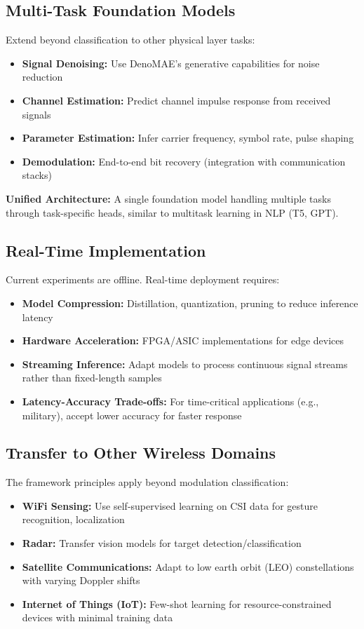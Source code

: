 \subsection{Multi-Task Foundation Models}

Extend beyond classification to other physical layer tasks:
\begin{itemize}
    \item \textbf{Signal Denoising:} Use DenoMAE's generative capabilities for noise reduction
    \item \textbf{Channel Estimation:} Predict channel impulse response from received signals
    \item \textbf{Parameter Estimation:} Infer carrier frequency, symbol rate, pulse shaping
    \item \textbf{Demodulation:} End-to-end bit recovery (integration with communication stacks)
\end{itemize}

\textbf{Unified Architecture:} A single foundation model handling multiple tasks through task-specific heads, similar to multitask learning in NLP (T5, GPT).

\subsection{Real-Time Implementation}

Current experiments are offline. Real-time deployment requires:
\begin{itemize}
    \item \textbf{Model Compression:} Distillation, quantization, pruning to reduce inference latency
    \item \textbf{Hardware Acceleration:} FPGA/ASIC implementations for edge devices
    \item \textbf{Streaming Inference:} Adapt models to process continuous signal streams rather than fixed-length samples
    \item \textbf{Latency-Accuracy Trade-offs:} For time-critical applications (e.g., military), accept lower accuracy for faster response
\end{itemize}

\subsection{Transfer to Other Wireless Domains}

The framework principles apply beyond modulation classification:
\begin{itemize}
    \item \textbf{WiFi Sensing:} Use self-supervised learning on CSI data for gesture recognition, localization
    \item \textbf{Radar:} Transfer vision models for target detection/classification
    \item \textbf{Satellite Communications:} Adapt to low earth orbit (LEO) constellations with varying Doppler shifts
    \item \textbf{Internet of Things (IoT):} Few-shot learning for resource-constrained devices with minimal training data
\end{itemize}

